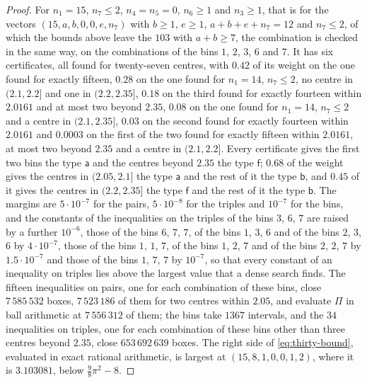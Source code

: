 \documentclass[11pt,reqno]{amsart}
\renewcommand{\_}{\origunderscore\allowbreak}
\numberwithin{equation}{section}
\theoremstyle{plain}
\theoremstyle{definition}
\theoremstyle{remark}
\begin{document}
\begin{proof}
For $n_1=15$, $n_7\le2$, $n_4=n_5=0$, $n_6\ge1$ and $n_3\ge1$, that is
for the vectors $(15,a,b,0,0,e,n_7)$ with $b\ge1$, $e\ge1$,
$a+b+e+n_7=12$ and $n_7\le2$, of which the bounds above leave the $103$
with $a+b\ge7$, the combination is checked in the same way, on the
combinations of the bins $1$, $2$, $3$, $6$ and $7$. It has six
certificates, all found for twenty-seven centres, with $0.42$ of its
weight on the one found for exactly fifteen, $0.28$ on the one found for
$n_1=14$, $n_7\le2$, no centre in $(2.1,2.2]$ and one in $(2.2,2.35]$,
$0.18$ on the third found for exactly fourteen within $2.0161$ and at most
two beyond $2.35$, $0.08$ on the one found for $n_1=14$, $n_7\le2$ and a
centre in $(2.1,2.35]$, $0.03$ on the second found for exactly fourteen
within $2.0161$ and $0.0003$ on the first of the two found for exactly
fifteen within $2.0161$, at most two beyond $2.35$ and a centre in
$(2.1,2.2]$. Every certificate gives the first two bins the type
$\mathsf a$ and the centres beyond $2.35$ the type $\mathsf f$; $0.68$ of
the weight gives the centres in $(2.05,2.1]$ the type $\mathsf a$ and the
rest of it the type $\mathsf b$, and $0.45$ of it gives the centres in
$(2.2,2.35]$ the type $\mathsf f$ and the rest of it the type $\mathsf b$.
The margins are $5\cdot10^{-7}$ for the pairs, $5\cdot10^{-8}$ for the
triples and $10^{-7}$ for the bins, and the constants of the inequalities
on the triples of the bins $3$, $6$, $7$ are raised by a further
$10^{-6}$, those of the bins $6$, $7$, $7$, of the bins $1$, $3$, $6$ and
of the bins $2$, $3$, $6$ by $4\cdot10^{-7}$, those of the bins $1$, $1$,
$7$, of the bins $1$, $2$, $7$ and of the bins $2$, $2$, $7$ by
$1.5\cdot10^{-7}$ and those of the bins $1$, $7$, $7$ by $10^{-7}$, so
that every constant of an inequality on triples lies above the largest
value that a dense search finds. The fifteen inequalities on pairs, one
for each combination of these bins, close $7\,585\,532$ boxes,
$7\,523\,186$ of them for two centres within $2.05$, and evaluate $\Pi$ in
ball arithmetic at $7\,556\,312$ of them; the bins take $1367$ intervals,
and the $34$ inequalities on triples, one for each combination of these
bins other than three centres beyond $2.35$, close $653\,692\,639$ boxes.
The right side of \eqref{eq:thirty-bound}, evaluated in exact rational
arithmetic, is largest at $(15,8,1,0,0,1,2)$, where it is $3.103081$,
below $\frac98\pi^2-8$.


\end{proof}
\end{document}
